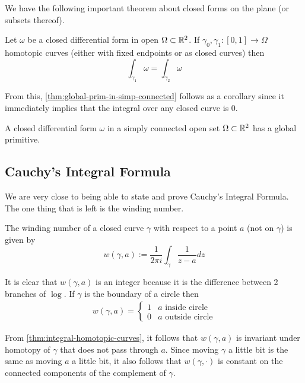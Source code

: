 We have the following important theorem about closed forms on the plane (or subsets thereof). 
\begin{theorem}\label{thm:integral-homotopic-curves}
Let $\omega$ be a closed differential form in open $\Omega \subset \mathbb{R}^2$. If $\gamma_0, \gamma_1: [0, 1] \to \Omega$ homotopic curves (either with fixed endpoints or as closed curves) then
$$\int_{\gamma_1} \omega = \int_{\gamma_2} \omega$$
\end{theorem}

From this, \autoref{thm:global-prim-in-simp-connected} follows as a corollary since it immediately implies that the integral over any closed curve is 0.
\begin{theorem}\label{thm:global-prim-in-simp-connected}
    A closed differential form $\omega$ in a simply connected open set $\Omega \subset \mathbb{R}^2$ has a global primitive.
\end{theorem}

\subsection{Cauchy's Integral Formula}
We are very close to being able to state and prove Cauchy's Integral Formula. The one thing that is left is the winding number.
\begin{definition}
The winding number of a closed curve $\gamma$ with respect to a point $a$ (not on $\gamma$) is given by
$$w(\gamma, a) := \frac{1}{2\pi i} \int_\gamma \frac{1}{z - a}dz$$
\end{definition}

It is clear that $w(\gamma, a)$ is an integer because it is the difference between 2 branches of $\log$. If $\gamma$ is the boundary of a circle then
\begin{align*}
    w(\gamma, a) = 
    \begin{cases}
        1 & a \text{ inside circle}\\
        0 & a \text{ outside circle}
    \end{cases}
\end{align*}

From \autoref{thm:integral-homotopic-curves}, it follows that $w(\gamma, a)$ is invariant under homotopy of $\gamma$ that does not pass through $a$. Since moving $\gamma$ a little bit is the same as moving $a$ a little bit, it also follows that $w(\gamma, \cdot)$ is constant on the connected components of the complement of $\gamma$. 

